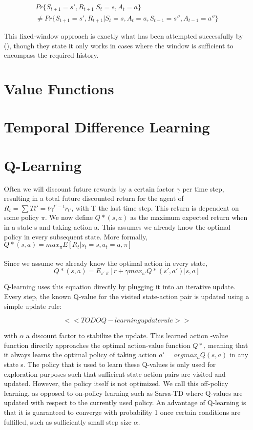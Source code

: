 \begin{equation}
\begin{split}
Pr\{S_{t+1}=s', R_{t+1}| S_t = s, A_t = a\} \\
\neq Pr\{S_{t+1}=s', R_{t+1}| S_t = s, A_t = a, S_{t-1} = s'', A_{t-1}=a''\} 
\end{split}
\end{equation}

This fixed-window approach is exactly what has been attempted successfully by
\citeauthor{Lin1992a} (\citeyear{Lin1992a}),
though they state it only works in cases
where the window is sufficient to encompass the required history.


\section{Value Functions}

\section{Temporal Difference Learning}

\section{Q-Learning}
Often we will discount future rewards
by a certain factor $\gamma$ per time step,
resulting in a total future discounted return
for the agent of
$R_t = \sum{T}{t'=t} \gamma^{t'-t}r_{t'}$,
with T the last time step.
This return is dependent on some policy $\pi$.
We now define $Q*(s,a)$ as the maximum expected return
when in a state s and taking action a.
This assumes we already know the optimal policy
in every subsequent state.
More formally,
$Q*(s,a) = max_{\pi}E[R_t|s_t=s, a_t=a, \pi]$

\paragraph{}
Since we assume we already know the optimal action in every state,
$$Q*(s,a) = E_{s'~\mathcal{E}}[r+\gamma max_{a'}Q*(s',a')|s,a]$$

Q-learning uses this equation directly
by plugging it into an iterative update.
Every step, the known Q-value for the visited state-action pair
is updated using a simple update rule:

$$<<TODO Q-learning update rule>>$$

with $\alpha$ a discount factor to stabilize the update.
This learned action	-value function directly approaches
the optimal action-value function $Q*$,
meaning that it always learns the optimal policy
of taking action $a' = argmax_{a}Q(s,a)$
in any state s.
The policy that is used to learn these Q-values
is only used for exploration purposes such that
sufficient state-action pairs are visited
and updated.
However, the policy itself is not optimized.
We call this off-policy learning,
as opposed to on-policy learning such as Sarsa-TD
where Q-values are updated with respect to
the currently used policy.
An advantage of Q-learning
is that it is guaranteed to converge
with probability 1
once certain conditions are fulfilled,
such as sufficiently small step size $\alpha$.

